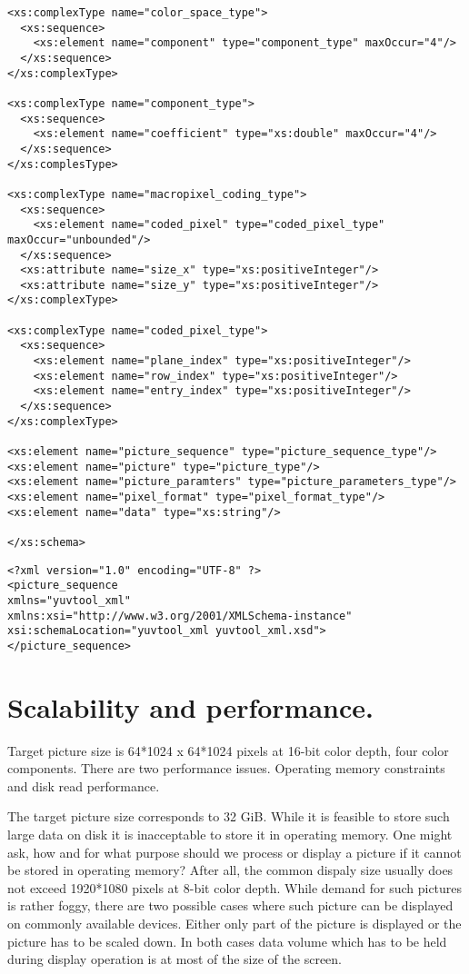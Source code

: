 \begin{verbatim}
<xs:complexType name="color_space_type">
  <xs:sequence>
    <xs:element name="component" type="component_type" maxOccur="4"/>
  </xs:sequence>
</xs:complexType>

<xs:complexType name="component_type">
  <xs:sequence>
	<xs:element name="coefficient" type="xs:double" maxOccur="4"/>
  </xs:sequence>
</xs:complesType>

<xs:complexType name="macropixel_coding_type">
  <xs:sequence>
    <xs:element name="coded_pixel" type="coded_pixel_type" maxOccur="unbounded"/>
  </xs:sequence>
  <xs:attribute name="size_x" type="xs:positiveInteger"/>
  <xs:attribute name="size_y" type="xs:positiveInteger"/>
</xs:complexType>

<xs:complexType name="coded_pixel_type">
  <xs:sequence>
	<xs:element name="plane_index" type="xs:positiveInteger"/>
	<xs:element name="row_index" type="xs:positiveInteger"/>
	<xs:element name="entry_index" type="xs:positiveInteger"/>
  </xs:sequence>
</xs:complexType>

<xs:element name="picture_sequence" type="picture_sequence_type"/>
<xs:element name="picture" type="picture_type"/>
<xs:element name="picture_paramters" type="picture_parameters_type"/>
<xs:element name="pixel_format" type="pixel_format_type"/>
<xs:element name="data" type="xs:string"/>

</xs:schema> 
\end{verbatim}

\begin{verbatim}
<?xml version="1.0" encoding="UTF-8" ?>
<picture_sequence
xmlns="yuvtool_xml"
xmlns:xsi="http://www.w3.org/2001/XMLSchema-instance"
xsi:schemaLocation="yuvtool_xml yuvtool_xml.xsd">
</picture_sequence>
\end{verbatim}

\section{Scalability and performance.}

Target picture size is 64*1024 x 64*1024 pixels at 16-bit color depth, four color components. There are two performance issues. Operating memory constraints and disk read performance.

The target picture size corresponds to 32 GiB. While it is feasible to store such large data on disk it is inacceptable to store it in operating memory. One might ask, how and for what purpose should we process or display a picture if it cannot be stored in operating memory? After all, the common dispaly size usually does not exceed 1920*1080 pixels at 8-bit color depth. While demand for such pictures is rather foggy, there are two possible cases where such picture can be displayed on commonly available devices. Either only part of the picture is displayed or the picture has to be scaled down. In both cases data volume which has to be held during display operation is at most of the size of the screen.

